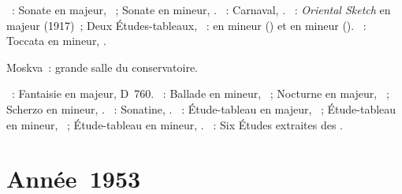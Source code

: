\begin{description}
 \textsc{\Beethoven{}}~: Sonate en \kD majeur, ~; Sonate en \kF
 mineur, .
 \textsc{\Schumann{}}~: Carnaval, .
 \textsc{\Rachmaninov{}}~: \emph{Oriental Sketch} en \kB \Flat majeur
 (1917)~; Deux Études-tableaux, ~: en \kB mineur () et en
 \kA mineur ().
 \textsc{\Prokofiev{}}~: Toccata en \kD mineur, .
 \item[\DateWithWeekDay{1952-11-09}]
 Moskva~: grande salle du conservatoire.

 \textsc{\Schubert{}}~: Fantaisie  en \kC majeur, D~760.
 \textsc{\Chopin{}}~: Ballade en \kG mineur, ~; Nocturne en \kG
 majeur,  ~; Scherzo en \kB mineur, .
 \textsc{\Kabalevski{}}~: Sonatine, .
 \textsc{\Rachmaninov{}}~: Étude-tableau en \kC majeur, 
 ~; Étude-tableau en \kE \Flat mineur,  ~;
 Étude-tableau en \kA mineur,  .
 \textsc{\Scriabine{}}~: Six Études extraites des .
\end{description}

\section{Année~1953}

